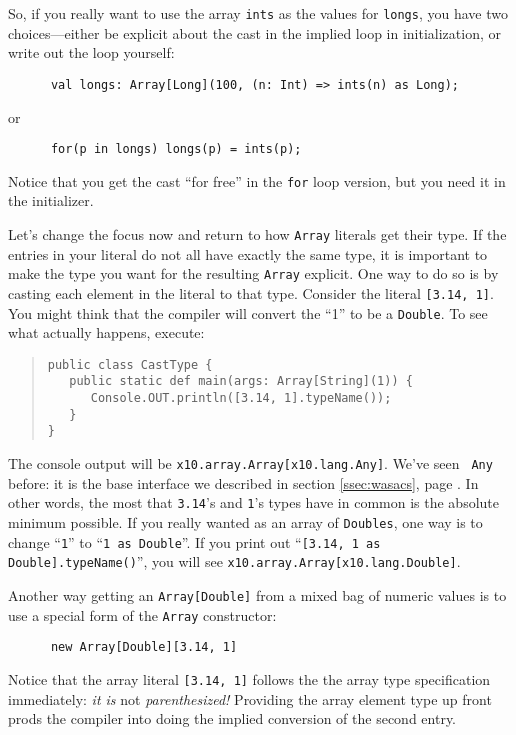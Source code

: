 So, if you really want to use the array {\tt ints} as the values for {\tt longs},
you have two choices---either be explicit about the cast in the implied loop
in initialization, or write out the loop yourself:
\begin{verbatim} 
      val longs: Array[Long](100, (n: Int) => ints(n) as Long);
\end{verbatim}
or 
\begin{verbatim}
      for(p in longs) longs(p) = ints(p);
\end{verbatim}
Notice that you get the cast ``for free'' in the {\tt for} loop version, but
you need it in the initializer.

Let's change the focus now and return to how {\tt Array} literals get their
type.
If the entries in your  literal do
not all have exactly the same type, it is important to make the type you want
for the resulting {\tt Array} explicit.  One way to do so is
by casting each element in the literal to
that type. Consider the literal {\tt [3.14, 1]}.  You might think that the compiler
will convert the ``1'' to be a {\tt Double}.  To see what actually happens, execute:
\begin{quote}
\begin{verbatim}
public class CastType {
   public static def main(args: Array[String](1)) {
      Console.OUT.println([3.14, 1].typeName());
   }
}
\end{verbatim}
\end{quote}
The console output will be {\tt x10.array.Array[x10.lang.Any]}.  We've seen {\tt
Any} before: it is the base interface we described in section
\ref{ssec:wasacs}, page \pageref{ssec:wasacs}.  In other words, the most that
{\tt 3.14}'s and {\tt 1}'s types have in common is the absolute minimum possible.
If you really wanted as an array of {\tt Doubles}, one way is to change ``{\tt 1}'' 
to ``{\tt 1 as Double}''. If you print out ``{\tt [3.14, 1 as Double].typeName()}'', you
will see {\tt x10.array.Array[x10.lang.Double]}.

Another way getting an {\tt Array[Double]} from a mixed bag of numeric
values is to use a special form of the {\tt Array} constructor:
\begin{verbatim}
      new Array[Double][3.14, 1]
\end{verbatim}
Notice that the array
literal {\tt [3.14, 1]} follows the the array type specification immediately:
{\em it is} not {\em parenthesized!}  Providing the array element type up front
prods the compiler into doing the implied conversion of the second entry.

